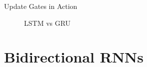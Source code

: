 \begin{vbframe}{Update Gates in Action}
  \begin{figure}
      \centering
      \caption{\footnotesize{LSTM vs GRU}}
  \end{figure}

\end{vbframe}

\section{Bidirectional RNNs}



